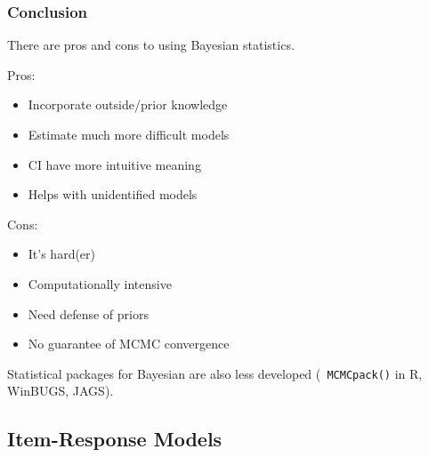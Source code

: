 \documentclass{beamer}
\begin{document}
\begin{frame}
\frametitle{Conclusion}
\pause
There are pros and cons to using Bayesian statistics.
\pause
\bigskip
\begin{multicols}{2}
Pros:
\pause
\begin{itemize}
\item Incorporate outside/prior knowledge
\pause
\item Estimate much more difficult models
\pause
\item CI have more intuitive meaning
\pause
\item Helps with unidentified models
\end{itemize}
\newpage
\pause
Cons:
\pause
\begin{itemize}
\item It's hard(er)
\pause
\item Computationally intensive
\pause
\item Need defense of priors
\pause
\item No guarantee of MCMC convergence
\end{itemize}
\end{multicols}
Statistical packages for Bayesian are also less developed ({\tt
MCMCpack()} in R, WinBUGS, JAGS).
\end{frame}

\subsection{Item-Response Models}
\end{document}
